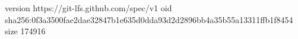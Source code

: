 version https://git-lfs.github.com/spec/v1
oid sha256:0f3a3500fae2dae32847b1e635d0dda93d2d2896bb4a35b55a13311ffb1f8454
size 174916
